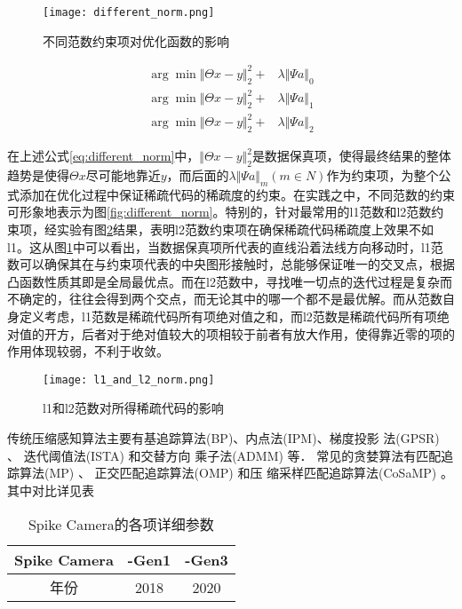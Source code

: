 \begin{figure}[ht]
  \centering
  \texttt{[image: different\_norm.png]}
  \label{fig:differnet_norm}
  \caption{不同范数约束项对优化函数的影响}
\end{figure}

\begin{equation}
    \begin{aligned}
      \arg\min \Vert \Theta x - y \Vert_2^2 +& \lambda \Vert \Psi a \Vert_0  \\
      \arg\min \Vert \Theta x - y \Vert_2^2 +& \lambda \Vert \Psi a \Vert_1  \\
      \arg\min \Vert \Theta x - y \Vert_2^2 +& \lambda \Vert \Psi a \Vert_2 
    \end{aligned}
    \label{eq:different_norm}
\end{equation}

在上述公式\ref{eq:different_norm}中，$\Vert \Theta x - y \Vert_2^2$是数据保真项，使得最终结果的整体趋势是使得$\Theta x$尽可能地靠近$y$，而后面的$\lambda \Vert \Psi a \Vert_m(m\in N)$作为约束项，为整个公式添加在优化过程中保证稀疏代码的稀疏度的约束。在实践之中，不同范数的约束可形象地表示为图\ref{fig:different_norm}。特别的，针对最常用的l1范数和l2范数约束项，经实验有图\ref{fig:l1_and_l2_norm}结果，表明l2范数约束项在确保稀疏代码稀疏度上效果不如l1。这从图\ref{fig:differnet_norm}中可以看出，当数据保真项所代表的直线沿着法线方向移动时，l1范数可以确保其在与约束项代表的中央图形接触时，总能够保证唯一的交叉点，根据凸函数性质其即是全局最优点。而在l2范数中，寻找唯一切点的迭代过程是复杂而不确定的，往往会得到两个交点，而无论其中的哪一个都不是最优解。而从范数自身定义考虑，l1范数是稀疏代码所有项绝对值之和，而l2范数是稀疏代码所有项绝对值的开方，后者对于绝对值较大的项相较于前者有放大作用，使得靠近零的项的作用体现较弱，不利于收敛。
\begin{figure}[ht]
  \centering
  \texttt{[image: l1\_and\_l2\_norm.png]}
  \label{fig:l1_and_l2_norm}
  \caption{l1和l2范数对所得稀疏代码的影响}
\end{figure}

传统压缩感知算法主要有基追踪算法(BP)、内点法(IPM)、梯度投影
法(GPSR)  、 迭代阈值法(ISTA) 和交替方向
乘子法(ADMM)  等． 常见的贪婪算法有匹配追
踪算法(MP) 、 正交匹配追踪算法(OMP)  和压
缩采样匹配追踪算法(CoSaMP) 。其中对比详见表

\begin{table}
  \centering
  \caption{Spike Camera的各项详细参数}
  \label{tab:spike_camera_parameter}
  \begin{tabular}{ccc}
    \toprule
    Spike Camera & -Gen1\cite{dong2018spike}&-Gen3\cite{Huang_Tiejun110} \\
    \midrule
    年份 &2018&2020 \\
    
    \bottomrule
  \end{tabular}
\end{table}
